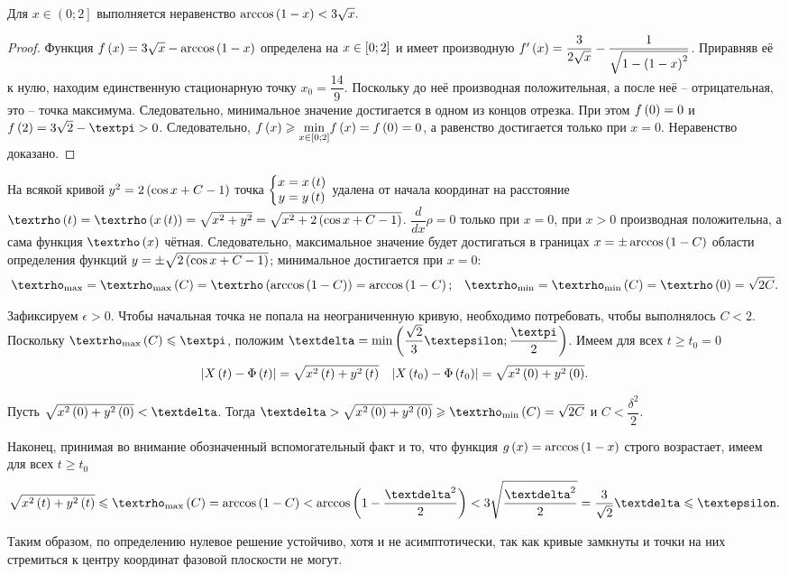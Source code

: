 \documentclass[a5paper,10pt]{article}
\begin{document}
\begin{framed}
Для $x \in \left(0; 2\right]$ выполняется неравенство $\arccos\left(1 - x\right) < 3\sqrt{x}.$
\begin{proof}
    Функция $f\left(x\right) = 3\sqrt{x} - \arccos\left(1 - x\right)$ определена    на $x \in \left[0; 2\right]$ и имеет производную $f'\left(x\right) = \dfrac {3} {2\sqrt{x}} - \dfrac {1} {\sqrt{1 - \left(1 - x\right)^2}}$. Приравняв её к нулю, находим единственную стационарную точку $x_{0} = \dfrac {14} {9}$. Поскольку до неё производная положительная, а после неё -- отрицательная, это -- точка максимума. Следовательно, минимальное значение достигается в одном из концов отрезка. При этом $f\left(0\right) = 0$ и $f\br{2} = 3\sqrt{2} - \pi > 0$. Следовательно, $f\left(x\right) \geqslant \displaystyle{\min_{x \in \left[0;2\right]}} {f\left(x\right)} = f\left(0\right) = 0$, а равенство достигается только при $x = 0$. Неравенство доказано.
\end{proof}
\end{framed}

На всякой кривой $y^2 = 2\left(\cos x + C - 1\right)$ точка $\left\{ \begin{matrix} x = x\left(t\right) \\ y = y\left(t\right) \end{matrix} \right.$ удалена от начала координат на расстояние $\rho\br{t} = \rho\br{x\br{t}} = \sqrt{x^2 + y^2} = \sqrt{x^2 + 2\br{\cos{x} + C - 1}}$. $\dfrac {d} {dx} \rho = 0$ только при $x = 0$, при $x > 0$ производная положительна, а сама функция $\rho\br{x}$ чётная. Следовательно, максимальное значение будет достигаться в границах $x = \pm \arccos\left(1 - C\right)$ области определения функций $y = \pm \sqrt{2\left(\cos{x} + C - 1\right)}$; минимальное достигается при $x = 0$:
\begin{align*}\rho_{\max} = \rho_{\max}\br{C} = \rho\br{\arccos\br{1 - C}}= \arccos\br{1 - C}; && \rho_{\min} = \rho_{\min}\br{C} = \rho\br{0} = \sqrt{2C}.
\end{align*}

Зафиксируем $\epsilon > 0$. Чтобы начальная точка не попала на неограниченную кривую, необходимо потребовать, чтобы выполнялось $C < 2$. Поскольку $\rho_{\max}\br{C} \le \pi$, положим $\delta = \min\br{\dfrac {\sqrt{2}} {3} \epsilon; \dfrac {\pi} {2}}$. Имеем для всех $t \ge t_{0} = 0$
\begin{align*}
    \left|X\left(t\right) - \Phi\left(t\right)\right| = \sqrt{x^2\left(t\right) + y^2\left(t\right)}
    && \left|X\left(t_0\right) - \Phi\left(t_0\right)\right| = \sqrt{x^2\left(0\right) + y^2\left(0\right)}.
\end{align*}

Пусть $\sqrt{x^2\br{0} + y^2\br{0}} < \delta$. Тогда $\delta > \sqrt{x^2\br{0} + y^2\br{0}} \ge \rho_{\min}\br{C} = \sqrt{2C}$ и $C < \dfrac {\delta^2} {2}$.

Наконец, принимая во внимание обозначенный вспомогательный факт и то, что функция $g\left(x\right) = \arccos\left(1 - x\right)$ строго возрастает, имеем для всех $t \ge t_{0}$
$$\sqrt{x^2\br{t} + y^2\br{t}} 
\le \rho_{\max}\br{C} 
= \arccos\br{1 - C}
< \arccos\br{1 - \frac {\delta^2} {2}}
< 3 \sqrt{\frac{\delta^2} {2}}
= \frac {3} {\sqrt{2}}\delta
\le \epsilon.$$

Таким образом, по определению нулевое решение устойчиво, хотя и не асимптотически, так как кривые замкнуты и точки на них стремиться к центру координат фазовой плоскости не могут.
\end{document}
